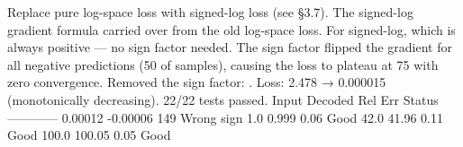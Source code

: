 {} Replace pure log-space loss with signed-log loss (see §3.7).\markdownRendererInterblockSeparator
{}
\markdownRendererSectionEnd \markdownRendererSectionBegin
{}\markdownRendererInterblockSeparator
{} The signed-log gradient formula carried over  from the old log-space loss. For signed-log,  which is always positive — no sign factor needed.\markdownRendererParagraphSeparator
{} The sign factor flipped the gradient for all negative predictions (\markdownRendererTilde{}50\markdownRendererPercentSign{} of samples), causing the loss to plateau at \markdownRendererTilde{}75 with zero convergence.\markdownRendererParagraphSeparator
{} Removed the sign factor: .\markdownRendererInterblockSeparator
{}
\markdownRendererSectionEnd \markdownRendererSectionBegin
{}\markdownRendererInterblockSeparator
{}Loss: 2.478 → 0.000015 (monotonically decreasing). 22/22 tests passed.\markdownRendererParagraphSeparator
{}\markdownRendererPipe{} Input \markdownRendererPipe{} Decoded \markdownRendererPipe{} Rel Err \markdownRendererPipe{} Status \markdownRendererPipe{}\markdownRendererSoftLineBreak
{}\markdownRendererPipe{}---\markdownRendererPipe{}---\markdownRendererPipe{}---\markdownRendererPipe{}---\markdownRendererPipe{}\markdownRendererSoftLineBreak
{}\markdownRendererPipe{} 0.00012 \markdownRendererPipe{} -0.00006 \markdownRendererPipe{} 149\markdownRendererPercentSign{} \markdownRendererPipe{} Wrong sign \markdownRendererPipe{}\markdownRendererSoftLineBreak
{}\markdownRendererPipe{} 1.0 \markdownRendererPipe{} 0.999 \markdownRendererPipe{} 0.06\markdownRendererPercentSign{} \markdownRendererPipe{} Good \markdownRendererPipe{}\markdownRendererSoftLineBreak
{}\markdownRendererPipe{} 42.0 \markdownRendererPipe{} 41.96 \markdownRendererPipe{} 0.11\markdownRendererPercentSign{} \markdownRendererPipe{} Good \markdownRendererPipe{}\markdownRendererSoftLineBreak
{}\markdownRendererPipe{} 100.0 \markdownRendererPipe{} 100.05 \markdownRendererPipe{} 0.05\markdownRendererPercentSign{} \markdownRendererPipe{} Good \markdownRendererPipe{}\markdownRendererSoftLineBreak
